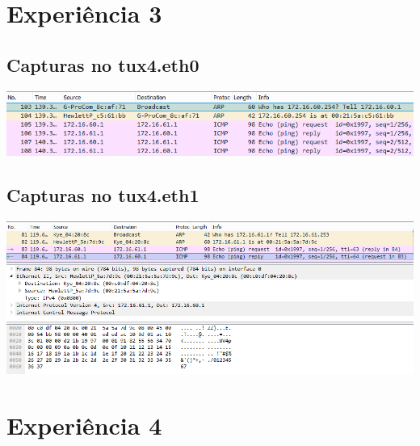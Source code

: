 \documentclass[11pt,a4paper,reqno]{report}
\numberwithin{equation}{section}
\begin{document}
\begin{appendices}
\section{Experiência 3}%

\subsection{Capturas no tux4.eth0}
\label{ex3_eth0}
\includegraphics[width=16cm]{ex3_tux4eth0_ARP.png}

\subsection{Capturas no tux4.eth1}
\label{ex3_eth1}
\includegraphics[width=16cm]{ex3_tux4eth1_pingdetailed.png}

\section{Experiência 4}


\end{appendices}
\end{document}
